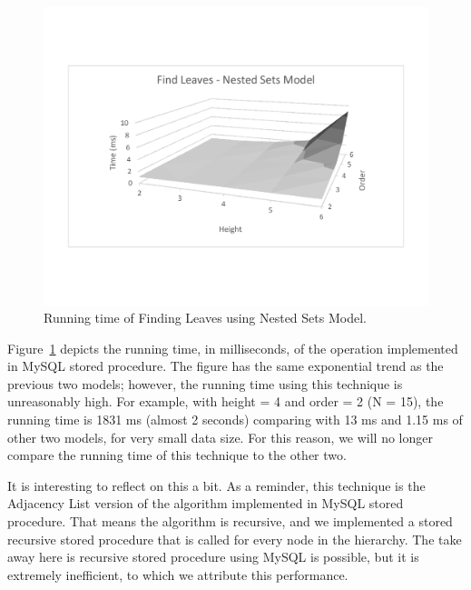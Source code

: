 \begin{figure}
\begin{center}
\includegraphics[width=6in]{images/eval/leaves/ns_surface.pdf}
\caption{Running time of Finding Leaves using Nested Sets Model.\label{fig-leaves-ns}}
\end{center}
\end{figure}

Figure~\ref{fig-leaves-ns} depicts the running time, in milliseconds, of the operation implemented in MySQL stored procedure. The figure has the same exponential trend as the previous two models; however, the running time using this technique is unreasonably high. For example, with height = 4 and order = 2 (N = 15), the running time is 1831 ms (almost 2 seconds) comparing with 13 ms and 1.15 ms of other two models, for very small data size. For this reason, we will no longer compare the running time of this technique to the other two.

It is interesting to reflect on this a bit. As a reminder, this technique is the Adjacency List version of the algorithm implemented in MySQL stored procedure. That means the algorithm is recursive, and we implemented a stored recursive stored procedure that is called for every node in the hierarchy. The take away here is recursive stored procedure using MySQL is possible, but it is extremely inefficient, to which we attribute this performance.

